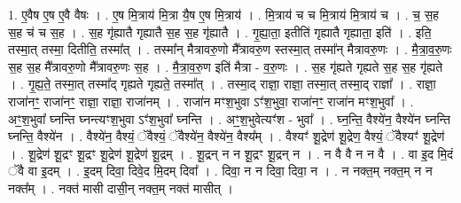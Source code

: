\documentclass[17pt]{extarticle}
\begin{document}
1. ए॒वैष ए॒ष ए॒वै वैषः । . ए॒ष मि॒त्राय॑ मि॒त्रा यै॒ष ए॒ष मि॒त्राय॑ । . मि॒त्राय॑ च च मि॒त्राय॑ मि॒त्राय॑ च । . च॒ स॒ह स॒ह च॑ च स॒ह । . स॒ह गृ॑ह्यातै गृह्यातै स॒ह स॒ह गृ॑ह्यातै । . गृ॒ह्या॒ता॒ इतीति॑ गृह्यातै गृह्याता॒ इति॑ । . इति॒ तस्मा॒त् तस्मा॒ दितीति॒ तस्मा᳚त् । . तस्मा᳚न् मैत्रावरु॒णो मै᳚त्रावरु॒ण स्तस्मा॒त् तस्मा᳚न् मैत्रावरु॒णः । . मै॒त्रा॒व॒रु॒णः स॒ह स॒ह मै᳚त्रावरु॒णो मै᳚त्रावरु॒णः स॒ह । . मै॒त्रा॒व॒रु॒ण इति॑ मैत्रा - व॒रु॒णः । . स॒ह गृ॑ह्यते गृह्यते स॒ह स॒ह गृ॑ह्यते । . गृ॒ह्य॒ते॒ तस्मा॒त् तस्मा᳚द् गृह्यते गृह्यते॒ तस्मा᳚त् । . तस्मा॒द् राज्ञा॒ राज्ञा॒ तस्मा॒त् तस्मा॒द् राज्ञा᳚ । . राज्ञा॒ राजा॑नꣳ॒॒ राजा॑नꣳ॒॒ राज्ञा॒ राज्ञा॒ राजा॑नम् । . राजा॑न मꣳश॒भुवा ऽꣳ॑श॒भुवा॒ राजा॑नꣳ॒॒ राजा॑न मꣳश॒भुवा᳚ । . अꣳ॒॒श॒भुवा᳚ घ्नन्ति घ्नन्त्यꣳश॒भुवा ऽꣳ॑श॒भुवा᳚ घ्नन्ति । . अꣳ॒॒श॒भुवेत्यꣳ॑श - भुवा᳚ । . घ्न॒न्ति॒ वैश्ये॑न॒ वैश्ये॑न घ्नन्ति घ्नन्ति॒ वैश्ये॑न । . वैश्ये॑न॒ वैश्यं॒ ॅवैश्यं॒ ॅवैश्ये॑न॒ वैश्ये॑न॒ वैश्य᳚म् । . वैश्यꣳ॑ शू॒द्रेण॑ शू॒द्रेण॒ वैश्यं॒ ॅवैश्यꣳ॑ शू॒द्रेण॑ । . शू॒द्रेण॑ शू॒द्रꣳ शू॒द्रꣳ शू॒द्रेण॑ शू॒द्रेण॑ शू॒द्रम् । . शू॒द्रन् न न शू॒द्रꣳ शू॒द्रन् न । . न वै वै न न वै । . वा इ॒द मि॒दं ॅवै वा इ॒दम् । . इ॒दम् दिवा॒ दिवे॒द मि॒दम् दिवा᳚ । . दिवा॒ न न दिवा॒ दिवा॒ न । . न नक्त॒म् नक्त॒म् न न नक्त᳚म् । . नक्त॑ मासी दासी॒न् नक्त॒म् नक्त॑ मासीत् । \newline
\end{document}
